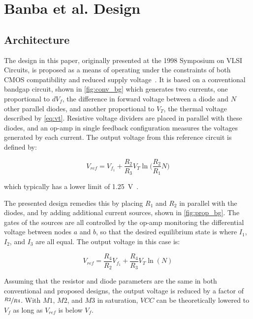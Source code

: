 \documentclass[journal]{IEEEtran}
\begin{document}
\section{Banba et al. Design}

\subsection{Architecture}

The design in this paper, originally presented at the 1998 Symposium on VLSI Circuits, is proposed as a means of operating under the constraints of both CMOS compatibility and reduced supply voltage~\cite{Banba1998}. It is based on a conventional bandgap circuit, shown in \cref{fig:conv_bg} which generates two currents, one proportional to \(dV_f\), the difference in forward voltage between a diode and \(N\) other parallel diodes, and another proportional to \(V_T\), the thermal voltage described by \cref{eq:vt}. Resistive voltage dividers are placed in parallel with these diodes, and an op-amp in single feedback configuration measures the voltages generated by each current. The output voltage from this reference circuit is defined by:

\begin{equation}
    V_{ref} = V_{f_1} + \frac{R_2}{R_3}V_T\ln\Biggl(\frac{R_2}{R_1}N\Biggr)
\label{eq:conv_vout}
\end{equation}

\noindent which typically has a lower limit of \qty{1.25}{\V}~\cite{Razavi2016}. 

The presented design remedies this by placing \(R_1\) and \(R_2\) in parallel with the diodes, and by adding additional current sources, shown in \cref{fig:prop_bg}. The gates of the sources are all controlled by the op-amp monitoring the differential voltage between nodes \(a\) and \(b\), so that the desired equilibrium state is where \(I_1\), \(I_2\), and \(I_3\) are all equal. The output voltage in this case is:

\begin{equation}
    V_{ref} = \frac{R_4}{R_2}V_{f_1} + \frac{R_4}{R_3}V_T \ln{(N)}
\label{eq:banba_vout}
\end{equation}

\noindent Assuming that the resistor and diode parameters are the same in both conventional and proposed designs, the output voltage is reduced by a factor of \(\sfrac{R2}{R4}\). With \(M1\), \(M2\), and \(M3\) in saturation, \(VCC\) can be theoretically lowered to \(V_f\) as long as \(V_{ref}\) is below \(V_f\).
\end{document}
